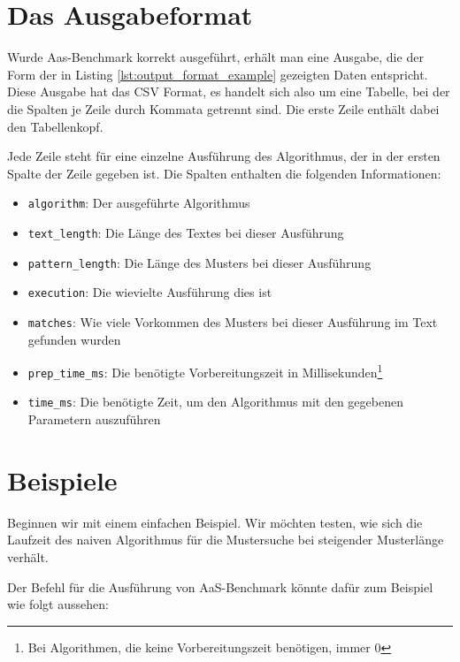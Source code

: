 \documentclass[twocolumn]{article}
\begin{document}
\section{Das Ausgabeformat}

Wurde Aas-Benchmark korrekt ausgeführt, erhält man eine Ausgabe, die der Form der in Listing \ref{lst:output_format_example} gezeigten Daten entspricht. Diese Ausgabe hat das CSV Format, es handelt sich also um eine Tabelle, bei der die Spalten je Zeile durch Kommata getrennt sind. Die erste Zeile enthält dabei den Tabellenkopf.

Jede Zeile steht für eine einzelne Ausführung des Algorithmus, der in der ersten Spalte der Zeile gegeben ist. Die Spalten enthalten die folgenden Informationen:

\begin{itemize}
    \item \texttt{algorithm}: Der ausgeführte Algorithmus
    \item \texttt{text\_length}: Die Länge des Textes bei dieser Ausführung
    \item \texttt{pattern\_length}: Die Länge des Musters bei dieser Ausführung
    \item \texttt{execution}: Die wievielte Ausführung dies ist
    \item \texttt{matches}: Wie viele Vorkommen des Musters bei dieser Ausführung im Text gefunden wurden
    \item \texttt{prep\_time\_ms}: Die benötigte Vorbereitungszeit in Millisekunden\footnote{Bei Algorithmen, die keine Vorbereitungszeit benötigen, immer 0}
    \item \texttt{time\_ms}: Die benötigte Zeit, um den Algorithmus mit den gegebenen Parametern auszuführen
\end{itemize}



\section{Beispiele}

Beginnen wir mit einem einfachen Beispiel. Wir möchten testen, wie sich die Laufzeit des naiven Algorithmus für die Mustersuche bei steigender Musterlänge verhält.

Der Befehl für die Ausführung von AaS-Benchmark könnte dafür zum Beispiel wie folgt aussehen:
\end{document}
